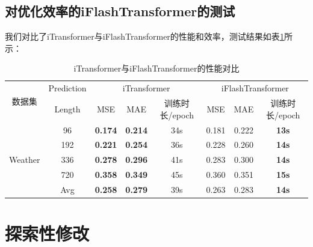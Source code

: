 \documentclass[twoside,12pt]{article}
\begin{document}
\subsection{对优化效率的iFlashTransformer的测试}
我们对比了iTransformer与iFlashTransformer的性能和效率，测试结果如表\ref{tab:itransformer_vs_iflashtransformer}所示：
\begin{table}[htbp]
  \caption{iTransformer与iFlashTransformer的性能对比}
  \label{tab:itransformer_vs_iflashtransformer}
  \vspace{5pt}
  \centering
  \resizebox{\textwidth}{!}
  {
    \begin{tabular}{c|c|ccc|ccc}
      \toprule
      \multirow{2}{*}{数据集}  & Prediction & \multicolumn{3}{c|}{iTransformer} & \multicolumn{3}{c}{iFlashTransformer}                                                   \\
      \cmidrule(lr){3-4} \cmidrule(lr){5-6}
                               & Length     & MSE                               & MAE                                   & 训练时长/epoch & MSE   & MAE   & 训练时长/epoch \\
      \midrule
      \multirow{5}{*}{Weather} & 96         & \textbf{0.174}                    & \textbf{0.214}                        & 34s            & 0.181 & 0.222 & \textbf{13s}   \\
                               & 192        & \textbf{0.221}                    & \textbf{0.254}                        & 36s            & 0.228 & 0.260 & \textbf{14s}   \\
                               & 336        & \textbf{0.278}                    & \textbf{0.296}                        & 41s            & 0.283 & 0.300 & \textbf{14s}   \\
                               & 720        & \textbf{0.358}                    & \textbf{0.349}                        & 45s            & 0.360 & 0.351 & \textbf{15s}   \\
      \cmidrule(lr){2-6}
                               & Avg        & \textbf{0.258}                    & \textbf{0.279}                        & 39s            & 0.263 & 0.283 & \textbf{14s}   \\
      \bottomrule
    \end{tabular}
  }
\end{table}

\newpage
\section{探索性修改}
\end{document}
